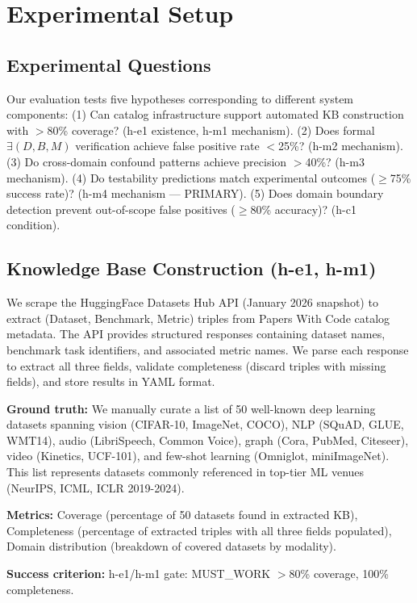 \section{Experimental Setup}

\subsection{Experimental Questions}

Our evaluation tests five hypotheses corresponding to different system components: (1) Can catalog infrastructure support automated KB construction with $>$80\% coverage? (h-e1 existence, h-m1 mechanism). (2) Does formal $\exists(D,B,M)$ verification achieve false positive rate $<$25\%? (h-m2 mechanism). (3) Do cross-domain confound patterns achieve precision $>$40\%? (h-m3 mechanism). (4) Do testability predictions match experimental outcomes ($\geq$75\% success rate)? (h-m4 mechanism --- PRIMARY). (5) Does domain boundary detection prevent out-of-scope false positives ($\geq$80\% accuracy)? (h-c1 condition).

\subsection{Knowledge Base Construction (h-e1, h-m1)}

We scrape the HuggingFace Datasets Hub API (January 2026 snapshot) to extract (Dataset, Benchmark, Metric) triples from Papers With Code catalog metadata. The API provides structured responses containing dataset names, benchmark task identifiers, and associated metric names. We parse each response to extract all three fields, validate completeness (discard triples with missing fields), and store results in YAML format.

\textbf{Ground truth:} We manually curate a list of 50 well-known deep learning datasets spanning vision (CIFAR-10, ImageNet, COCO), NLP (SQuAD, GLUE, WMT14), audio (LibriSpeech, Common Voice), graph (Cora, PubMed, Citeseer), video (Kinetics, UCF-101), and few-shot learning (Omniglot, miniImageNet). This list represents datasets commonly referenced in top-tier ML venues (NeurIPS, ICML, ICLR 2019-2024).

\textbf{Metrics:} Coverage (percentage of 50 datasets found in extracted KB), Completeness (percentage of extracted triples with all three fields populated), Domain distribution (breakdown of covered datasets by modality).

\textbf{Success criterion:} h-e1/h-m1 gate: MUST\_WORK $>$80\% coverage, 100\% completeness.

